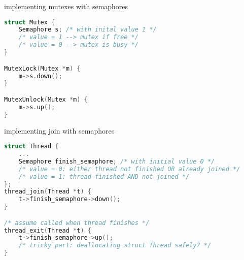 \begin{frame}[fragile,label=mutexWithSemaphore]{implementing mutexes with semaphores}
\begin{lstlisting}[language=C++,style=small]
struct Mutex {
    Semaphore s; /* with inital value 1 */
    /* value = 1 --> mutex if free */
    /* value = 0 --> mutex is busy */
}

MutexLock(Mutex *m) {
    m->s.down();
}

MutexUnlock(Mutex *m) {
    m->s.up();
}
\end{lstlisting}
\end{frame}


\begin{frame}[fragile,label=threadJoinWithSemaphore]{implementing join with semaphores}
\begin{lstlisting}[language=C++,style=smaller]
struct Thread {
    ...
    Semaphore finish_semaphore; /* with initial value 0 */
    /* value = 0: either thread not finished OR already joined */
    /* value = 1: thread finished AND not joined */
};
thread_join(Thread *t) {
    t->finish_semaphore->down();
}

/* assume called when thread finishes */
thread_exit(Thread *t) {
    t->finish_semaphore->up();
    /* tricky part: deallocating struct Thread safely? */
}
\end{lstlisting}
\end{frame}
